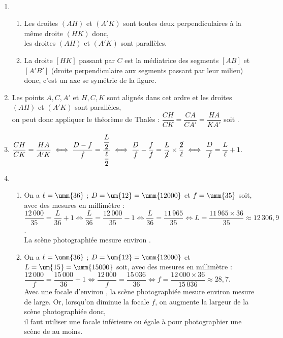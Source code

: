 \ \\ [-5mm]
   \begin{enumerate}
      \item
         \begin{enumerate}
            \item Les droites $(AH)$ et $(A'K)$ sont toutes deux perpendiculaires à la même droite $(HK)$ donc, \\
               {\blue les droites $(AH)$ et $(A'K)$ sont parallèles}.
            \item La droite $[HK]$ passant par $C$ est la médiatrice des segments $[AB]$ et $[A'B']$ (droite perpendiculaire aux segments passant par leur milieu) donc, {\blue c'est un axe se symétrie de la figure}.
         \end{enumerate}
      \setcounter{enumi}{1}
      \item Les points $A, C, A'$ et $H, C, K$ sont alignés dans cet ordre et les droites $(AH)$ et $(A'K)$ sont parallèles, \\ [1mm]
         on peut donc appliquer le théorème de Thalès : $\dfrac{CH}{CK} =\dfrac{CA}{CA'} =\dfrac{HA}{KA'}$ soit . \\
      \item $\dfrac{CH}{CK} =\dfrac{HA}{A'K} \iff \dfrac{D-f}{f} =\dfrac{\dfrac{L}{2}}{\dfrac{\ell}{2}} \iff \dfrac{D}{f}-\dfrac{f}{f}=\dfrac{L}{\cancel{2}}\times\dfrac{\cancel{2}}{\ell} \iff$ {\blue $\dfrac{D}{f} =\dfrac{L}{\ell}+1$}. \\ [1mm]
      \item
         \begin{enumerate}
            \item On a $\ell =\umm{36}$ ; $D =\um{12} =\umm{12000}$ et $f =\umm{35}$ soit, avec des mesures en millimètre : \\ [1mm]
               $\dfrac{12\,000}{35} =\dfrac{L}{36}+1 \iff \dfrac{L}{36} =\dfrac{12\,000}{35}-1 \iff \dfrac{L}{36} =\dfrac{11\,965}{35} \iff L =\dfrac{11\,965\times36}{35} \approx 12\,306,9$. \\ [1mm]
               {\blue La scène photographiée mesure environ }.
            \item On a $\ell =\umm{36}$ ; $D =\um{12} =\umm{12000}$ et $L =\um{15} =\umm{15000}$ soit, avec des mesures en millimètre : \\ [1mm]
               $\dfrac{12\,000}{f} =\dfrac{15\,000}{36}+1 \iff \dfrac{12\,000}{f}  =\dfrac{15\,036}{36} \iff f =\dfrac{12\,000\times36}{15\,036} \approx 28,7$. \\ [1mm]
               Avec une focale d'environ , la scène photographiée mesure environ mesure  de large. Or, lorsqu'on diminue la focale $f$, on augmente la largeur de la scène photographiée donc, \\
               {\blue il faut utiliser une focale inférieure ou égale à  pour photographier une scène de  au moins}.
         \end{enumerate}
   \end{enumerate}
